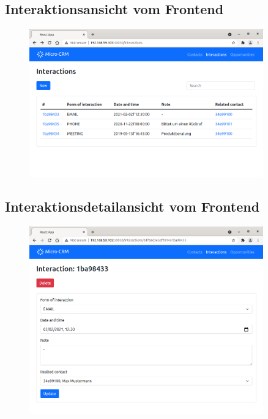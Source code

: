 \clearpage
\subsection*{Interaktionsansicht vom Frontend}

\begin{figure}[H] 
    \centering
    \includegraphics[width=0.9\textwidth]{figures/FrontendInteraktionen.png}
\end{figure}

\clearpage
\subsection*{Interaktionsdetailansicht vom Frontend}

\begin{figure}[H] 
    \centering
    \includegraphics[width=0.9\textwidth]{figures/FrontendInteraktion.png}
\end{figure}

